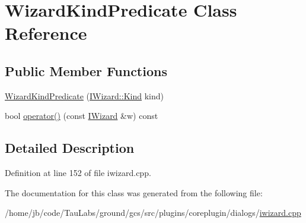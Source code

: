 \hypertarget{class_wizard_kind_predicate}{\section{\-Wizard\-Kind\-Predicate \-Class \-Reference}
\label{class_wizard_kind_predicate}
}
\subsection*{\-Public \-Member \-Functions}
\begin{DoxyCompactItemize}
\item 
\hyperlink{group___core_plugin_ga7ad7e94acedad1cb0bddb6f54079afb7}{\-Wizard\-Kind\-Predicate} (\hyperlink{group___core_plugin_ga90d21d8ad72cb14ddb8486fdff7b51f4}{\-I\-Wizard\-::\-Kind} kind)
\item 
bool \hyperlink{group___core_plugin_ga2116c3cbb7f3bfd113f1ff84d4394a4c}{operator()} (const \hyperlink{class_core_1_1_i_wizard}{\-I\-Wizard} \&w) const 
\end{DoxyCompactItemize}


\subsection{\-Detailed \-Description}


\-Definition at line 152 of file iwizard.\-cpp.



\-The documentation for this class was generated from the following file\-:\begin{DoxyCompactItemize}
\item 
/home/jb/code/\-Tau\-Labs/ground/gcs/src/plugins/coreplugin/dialogs/\hyperlink{iwizard_8cpp}{iwizard.\-cpp}\end{DoxyCompactItemize}
